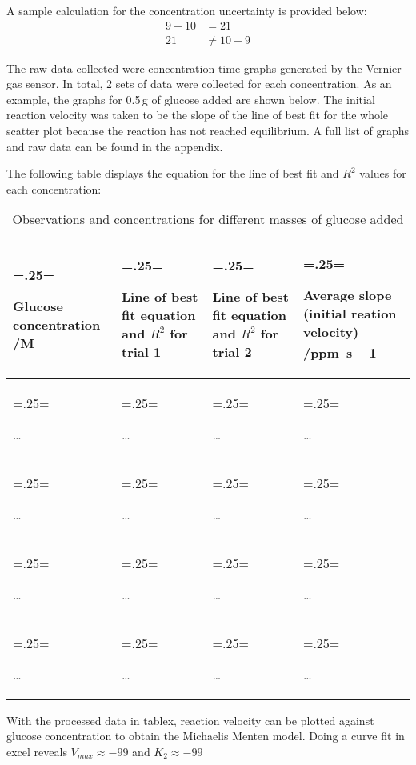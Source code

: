 \documentclass{article}
\begin{document}
A sample calculation for the concentration uncertainty is provided below:
\begin{align*}
    9 + 10 &= 21 \\
    21 &\neq 10 + 9
\end{align*}

The raw data collected were concentration-time graphs generated by the Vernier  gas sensor. In total, 2 sets of data were collected for each concentration. As an example, the graphs for 0.5\,\si{g} of glucose added are shown below. The initial reaction velocity was taken to be the slope of the line of best fit for the whole scatter plot because the reaction has not reached equilibrium. A full list of graphs and raw data can be found in the appendix.  %

The following table displays the equation for the line of best fit and $R^2$ values for each concentration:
\begin{table}[H]
    \centering
    \caption{Observations and concentrations for different masses of glucose added}
    \label{table:4}
    \begin{tabularx}{\textwidth} {
        | >{\hsize=.25\hsize \linewidth=\hsize \raggedright\arraybackslash}X
        | >{\hsize=.25\hsize \linewidth=\hsize \raggedright\arraybackslash}X
        | >{\hsize=.25\hsize \linewidth=\hsize \raggedright\arraybackslash}X
        | >{\hsize=.25\hsize \linewidth=\hsize \raggedright\arraybackslash}X |}
        \hline
        \rowcolor[HTML]{CCCCCC} Glucose concentration /\si{M} & Line of best fit equation and $R^2$ for trial 1 & Line of best fit equation and $R^2$ for trial 2 & Average slope (initial reation velocity) /\si{ppm.s^-1} \\
        \hline
        \dots & \dots & \dots & \dots \\
        \hline
        \dots & \dots & \dots & \dots \\
        \hline
        \dots & \dots & \dots & \dots \\
        \hline
        \dots & \dots & \dots & \dots \\
        \hline
    \end{tabularx}
    \end{table}

With the processed data in tablex, reaction velocity can be plotted against glucose concentration to obtain the Michaelis Menten model. Doing a curve fit in excel reveals $V_{max} \approx -99$ and $K_2 \approx -99$
\end{document}
